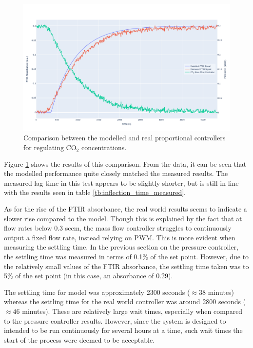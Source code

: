 \begin{figure}[h!]
	\centering
    \includegraphics[width=\linewidth]{chapter_5/figures/model_vs_real_co2_controller.png} 
	\caption{Comparison between the modelled and real proportional controllers for regulating CO$_2$ concentrations.}
	\label{fig:model_vs_real_co2_controller}
\end{figure} 

Figure \ref{fig:model_vs_real_co2_controller} shows the results of this comparison.
From the data, it can be seen that the modelled performance quite closely matched the measured results. The measured lag time in this test appears to be slightly shorter, but is still in line with the results seen in table \ref{tb:inflection_time_measured}. 

As for the rise of the FTIR absorbance, the real world results seems to indicate a slower rise compared to the model. Though this is explained by the fact that at flow rates below 0.3 sccm, the mass flow controller struggles to continuously output a fixed flow rate, instead relying on PWM. This is more evident when measuring the settling time. In the previous section on the pressure controller, the settling time was measured in terms of 0.1\% of the set point. However, due to the relatively small values of the FTIR absorbance, the settling time taken was to 5\% of the set point (in this case, an absorbance of 0.29). 

The settling time for model was approximately 2300 seconds ($\approx 38$ minutes) whereas the settling time for the real world controller was around 2800 seconds ($\approx 46$ minutes). These are relatively large wait times, especially when compared to the pressure controller results. However, since the system is designed to intended to be run continuously for several hours at a time, such wait times the start of the process were deemed to be acceptable.


